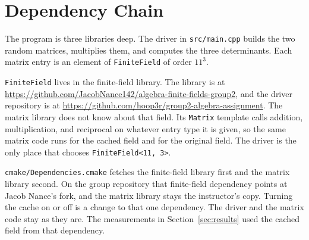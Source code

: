 \section{Dependency Chain}
\label{sec:chain}

The program is three libraries deep.
The driver in \texttt{src/main.cpp} builds the two random matrices, multiplies them, and computes the three determinants.
Each matrix entry is an element of \texttt{FiniteField} of order \(11^3\).

\texttt{FiniteField} lives in the finite-field library.
The library is at
\url{https://github.com/JacobNance142/algebra-finite-fields-group2},
and the driver repository is at
\url{https://github.com/hoop3r/group2-algebra-assignment}.
The matrix library does not know about that field.
Its \texttt{Matrix} template calls addition, multiplication, and reciprocal on whatever entry type it is given, so the same matrix code runs for the cached field and for the original field.
The driver is the only place that chooses \texttt{FiniteField<11, 3>}.

\texttt{cmake/Dependencies.cmake} fetches the finite-field library first and the matrix library second.
On the group repository that finite-field dependency points at Jacob Nance's fork, and the matrix library stays the instructor's copy.
Turning the cache on or off is a change to that one dependency.
The driver and the matrix code stay as they are.
The measurements in Section~\ref{sec:results} used the cached field from that dependency.
